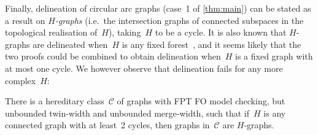 \documentclass[a4paper,UKenglish,cleveref,thm-restate]{lipics-v2021}
\theoremstyle{remark}
\newcommand{\Cc}{\mathcal{C}}
\begin{document}
Finally, delineation of circular arc graphs (case~1 of \cref{thm:main}) can be stated as a result on \emph{$H$-graphs} (i.e.\ the intersection graphs of connected subspaces in the topological realisation of~$H$), taking~$H$ to be a cycle.
It is also known that $H$-graphs are delineated when~$H$ is any fixed forest~\cite{bonomo2025noncrossinghgraphs},
and it seems likely that the two proofs could be combined to obtain delineation when~$H$ is a fixed graph with at most one cycle.
We however observe that delineation fails for any more complex~$H$:
\begin{theorem}\label{thm:Hgraphs-non-delin}
    There is a hereditary class~$\Cc$ of graphs with FPT FO model checking, but unbounded twin-width and unbounded merge-width,
    such that if~$H$ is any connected graph with at least~2 cycles, then graphs in~$\Cc$ are $H$-graphs.
\end{theorem}
\end{document}
